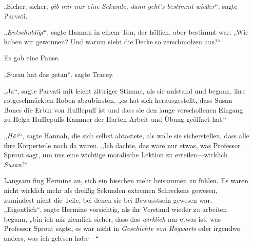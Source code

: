 „Sicher, sicher, \emph{gib mir nur eine Sekunde, dann geht’s bestimmt wieder}“, sagte Parvati.

„\emph{Entschuldigt}“, sagte Hannah in einem Ton, der höflich, aber bestimmt war. „Wie haben wir gewonnen? Und warum sieht die Decke so zerschmolzen aus?“

Es gab eine Pause.

„Susan hat das getan“, sagte Tracey.

„Ja“, sagte Parvati mit leicht zittriger Stimme, als sie aufstand und begann, ihre rotgeschmückten Roben abzubürsten, „es hat sich herausgestellt, dass Susan Bones die Erbin von Hufflepuff ist und dass sie den lange verschollenen Eingang zu Helga Hufflepuffs Kammer der Harten Arbeit und Übung geöffnet hat.“

„\emph{Hä?}“, sagte Hannah, die sich selbst abtastete, als wolle sie sicherstellen, dass alle ihre Körperteile noch da waren. „Ich dachte, das wäre nur etwas, was Professor Sprout sagt, um uns eine wichtige moralische Lektion zu erteilen—wirklich \emph{Susan}?“

Langsam fing Hermine an, sich ein bisschen mehr beisammen zu fühlen. Es waren nicht wirklich mehr als dreißig Sekunden extremen Schreckens gewesen, zumindest nicht die Teile, bei denen sie bei Bewusstsein gewesen war. „Eigentlich“, sagte Hermine vorsichtig, als ihr Verstand wieder zu arbeiten begann, „bin ich mir ziemlich sicher, dass das \emph{wirklich} nur etwas ist, was Professor Sprout sagte, es war nicht in \emph{Geschichte von Hogwarts} oder irgendwo anders, was ich gelesen habe—“

